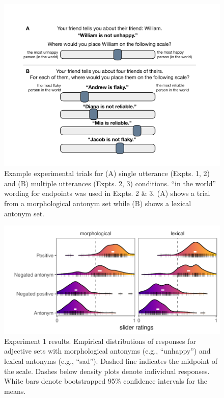 \documentclass[floatsintext,doc]{apa6}
\begin{document}
\begin{figure}[hbt]

{\centering \includegraphics[width=0.7\linewidth]{figs/experiment-slides-1} 

}

\caption{Example experimental trials for (A) single utterance (Expts. 1, 2) and (B) multiple utterances (Expts. 2, 3) conditions. ``in the world'' wording for endpoints was used in Expts. 2 \& 3. (A) shows a trial from a morphological antonym set while (B) shows a lexical antonym set.}\label{fig:experiment-slides}
\end{figure}

\begin{figure}[h]
\centering \includegraphics[width=0.95\linewidth]{figs/expt1_ridges_wCIs} 
\caption{Experiment 1 results. Empirical distributions of responses for adjective sets with morphological antonyms (e.g., ``unhappy'') and lexical antonyms (e.g., ``sad''). Dashed line indicates the midpoint of the scale. Dashes below density plots denote individual responses. White bars denote bootstrapped 95\% confidence intervals for the means.}\label{fig:expt1-results}
\end{figure}

\end{document}
